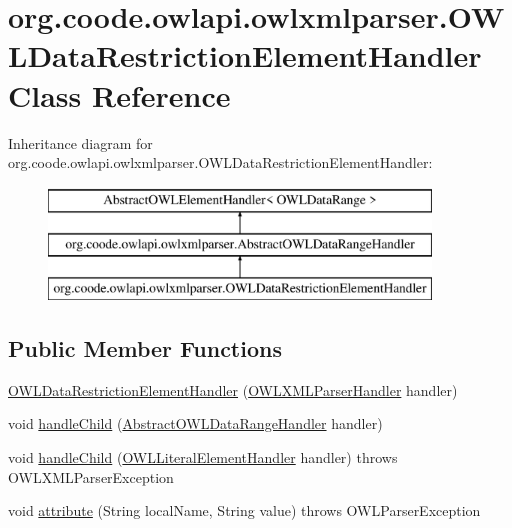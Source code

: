 \hypertarget{classorg_1_1coode_1_1owlapi_1_1owlxmlparser_1_1_o_w_l_data_restriction_element_handler}{\section{org.\-coode.\-owlapi.\-owlxmlparser.\-O\-W\-L\-Data\-Restriction\-Element\-Handler Class Reference}
\label{classorg_1_1coode_1_1owlapi_1_1owlxmlparser_1_1_o_w_l_data_restriction_element_handler}
}
Inheritance diagram for org.\-coode.\-owlapi.\-owlxmlparser.\-O\-W\-L\-Data\-Restriction\-Element\-Handler\-:\begin{figure}[H]
\begin{center}
\leavevmode
\includegraphics[height=3.000000cm]{classorg_1_1coode_1_1owlapi_1_1owlxmlparser_1_1_o_w_l_data_restriction_element_handler}
\end{center}
\end{figure}
\subsection*{Public Member Functions}
\begin{DoxyCompactItemize}
\item 
\hyperlink{classorg_1_1coode_1_1owlapi_1_1owlxmlparser_1_1_o_w_l_data_restriction_element_handler_ac87d2aa6658aeb329bb14ef9e2155e21}{O\-W\-L\-Data\-Restriction\-Element\-Handler} (\hyperlink{classorg_1_1coode_1_1owlapi_1_1owlxmlparser_1_1_o_w_l_x_m_l_parser_handler}{O\-W\-L\-X\-M\-L\-Parser\-Handler} handler)
\item 
void \hyperlink{classorg_1_1coode_1_1owlapi_1_1owlxmlparser_1_1_o_w_l_data_restriction_element_handler_a2a686e5a95c93aaaad118ed175faaa7e}{handle\-Child} (\hyperlink{classorg_1_1coode_1_1owlapi_1_1owlxmlparser_1_1_abstract_o_w_l_data_range_handler}{Abstract\-O\-W\-L\-Data\-Range\-Handler} handler)
\item 
void \hyperlink{classorg_1_1coode_1_1owlapi_1_1owlxmlparser_1_1_o_w_l_data_restriction_element_handler_add85bf086e0a43f838f48396e2891d9e}{handle\-Child} (\hyperlink{classorg_1_1coode_1_1owlapi_1_1owlxmlparser_1_1_o_w_l_literal_element_handler}{O\-W\-L\-Literal\-Element\-Handler} handler)  throws O\-W\-L\-X\-M\-L\-Parser\-Exception 
\item 
void \hyperlink{classorg_1_1coode_1_1owlapi_1_1owlxmlparser_1_1_o_w_l_data_restriction_element_handler_a0234a588d96eb406cf22c9b69764194d}{attribute} (String local\-Name, String value)  throws O\-W\-L\-Parser\-Exception 
\end{DoxyCompactItemize}
